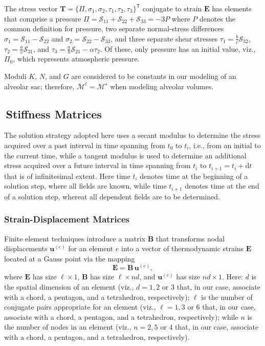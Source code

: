 The stress vector $\boldsymbol{T} = \{ \Pi, \sigma_1, \sigma_2, \tau_1, \tau_2, \tau_3 \}^{\mathsf{T}}$ conjugate to strain $\boldsymbol{E}$ has elements that comprise a pressure $\Pi = \mathcal{S}_{11} + \mathcal{S}_{22} + \mathcal{S}_{33} = -3P$ where $P$ denotes the common definition for pressure, two separate normal-stress differences $\sigma_1 = \mathcal{S}_{11} - \mathcal{S}_{22}$ and $\sigma_2 = \mathcal{S}_{22} - \mathcal{S}_{33}$, and three separate shear stresses $\tau_1 = \frac{b}{c} \mathcal{S}_{32}$, $\tau_2 = \frac{a}{c} \mathcal{S}_{31}$, and $\tau_3 = \frac{a}{b} \mathcal{S}_{21} - \alpha \tau_2$.  Of these, only pressure has an initial value, viz., $\Pi_0$, which represents atmospheric pressure.

Moduli $K$, $N$, and $G$ are considered to be constants in our modeling of an alveolar sac; therefore, $\boldsymbol{\mathcal{M}}^t = \boldsymbol{\mathcal{M}}^s$ when modeling alveolar volumes.

\subsection{$\,$Stiffness Matrices}

The solution strategy adopted here uses a secant modulus to determine the stress acquired over a past interval in time spanning from $t_0$ to $t_i$, i.e., from an initial to the current time, while a tangent modulus is used to determine an additional stress acquired over a future interval in time spanning from $t_i$ to $t_{i+1} = t_i + \mathrm{d}t$ that is of infinitesimal extent.  Here time $t_i$ denotes time at the beginning of a solution step, where all fields are known, while time $t_{i+1}$ denotes time at the end of a solution step, whereat all dependent fields are to be determined.


\subsubsection{Strain-Displacement Matrices}

Finite element techniques introduce a matrix $\mathbf{B}$ that transforms nodal displacements $\boldsymbol{u}^{(e)}$ for an element $e$ into a vector of thermo\-dynamic strains $\boldsymbol{E}$ located at a Gauss point via the mapping
\begin{equation}
\boldsymbol{E} = \mathbf{B} \, \boldsymbol{u}^{(e)},
\label{strain} 
\end{equation}
where $\boldsymbol{E}$ has size $\ell \! \times \! 1$, $\mathbf{B}$ has size $\ell \! \times \! nd$, and $\boldsymbol{u}^{(e)}$ has size $nd \! \times \! 1$.  Here: $d$ is the spatial dimension of an element (viz., $d = 1, 2$ or $3$ that, in our case, associate with a chord, a pentagon, and a tetrahedron, respectively); $\ell$ is the number of conjugate pairs appropriate for an element (viz., $\ell = 1, 3$ or $6$ that, in our case, associate with a chord, a pentagon, and a tetrahedron, respectively); while $n$ is the number of nodes in an element (viz., $n=2, 5$ or $4$ that, in our case, associate with a chord, a pentagon, and a tetrahedron, respectively).

